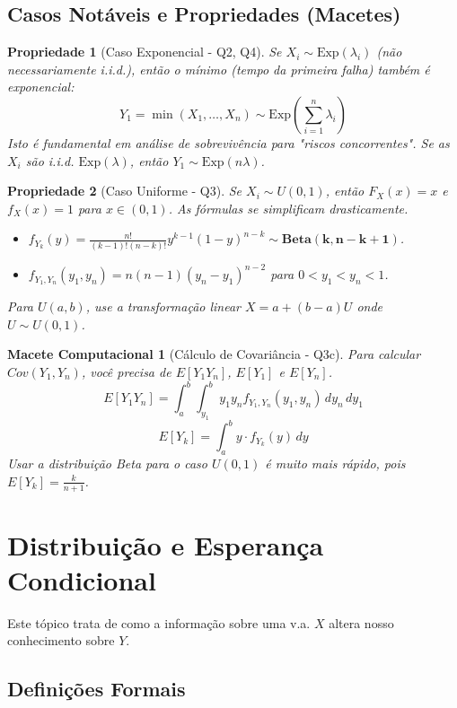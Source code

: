 \documentclass[12pt, a4paper]{article}
\newtheorem{prop}{Propriedade}
\newtheorem{macete}{Macete Computacional}
\begin{document}
\subsection{Casos Notáveis e Propriedades (Macetes)}

\begin{prop}[Caso Exponencial - Q2, Q4]
Se $X_i \sim \text{Exp}(\lambda_i)$ (não necessariamente i.i.d.), então o mínimo (tempo da primeira falha) também é exponencial:
$$ Y_1 = \min(X_1, \dots, X_n) \sim \text{Exp}\left(\sum_{i=1}^n \lambda_i\right) $$
Isto é fundamental em análise de sobrevivência para "riscos concorrentes". Se as $X_i$ são i.i.d. $\text{Exp}(\lambda)$, então $Y_1 \sim \text{Exp}(n\lambda)$.
\end{prop}

\begin{prop}[Caso Uniforme - Q3]
Se $X_i \sim U(0,1)$, então $F_X(x) = x$ e $f_X(x) = 1$ para $x \in (0,1)$. As fórmulas se simplificam drasticamente.
\begin{itemize}
    \item $f_{Y_k}(y) = \frac{n!}{(k-1)!(n-k)!} y^{k-1} (1-y)^{n-k} \sim \mathbf{\text{Beta}(k, n-k+1)}$.
    \item $f_{Y_1, Y_n}(y_1, y_n) = n(n-1)(y_n - y_1)^{n-2}$ para $0 < y_1 < y_n < 1$.
\end{itemize}
Para $U(a,b)$, use a transformação linear $X = a + (b-a)U$ onde $U \sim U(0,1)$.
\end{prop}

\begin{macete}[Cálculo de Covariância - Q3c]
Para calcular $Cov(Y_1, Y_n)$, você precisa de $E[Y_1 Y_n]$, $E[Y_1]$ e $E[Y_n]$.
$$ E[Y_1 Y_n] = \int_a^b \int_{y_1}^b y_1 y_n f_{Y_1, Y_n}(y_1, y_n) \,dy_n \,dy_1 $$
$$ E[Y_k] = \int_a^b y \cdot f_{Y_k}(y) \,dy $$
Usar a distribuição Beta para o caso $U(0,1)$ é muito mais rápido, pois $E[Y_k] = \frac{k}{n+1}$.
\end{macete}

\section{Distribuição e Esperança Condicional}

Este tópico trata de como a informação sobre uma v.a. $X$ altera nosso conhecimento sobre $Y$.

\subsection{Definições Formais}
\end{document}
